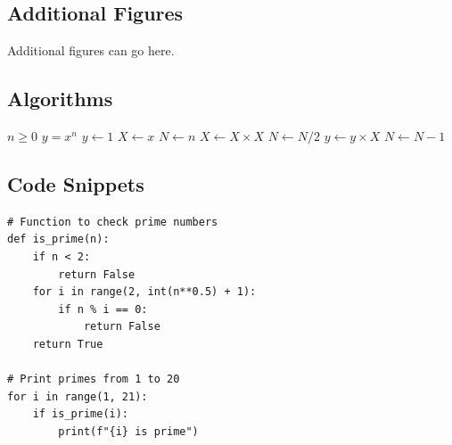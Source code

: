 \documentclass[11pt]{article}
\begin{document}
\subsection{Additional Figures}
Additional figures can go here.

\subsection{Algorithms}

\begin{algorithm}
\caption{An algorithm with caption}
\begin{algorithmic}
\Require $n \geq 0$
\Ensure $y = x^n$
\State $y \gets 1$
\State $X \gets x$
\State $N \gets n$
        \State $X \gets X \times X$
        \State $N \gets N/2$
    \Else
        \State $y \gets y \times X$
        \State $N \gets N - 1$
    \EndIf
\EndWhile
\end{algorithmic}
\end{algorithm}

\subsection{Code Snippets}

\begin{verbatim}
# Function to check prime numbers
def is_prime(n):
    if n < 2:
        return False
    for i in range(2, int(n**0.5) + 1):
        if n % i == 0:
            return False
    return True

# Print primes from 1 to 20
for i in range(1, 21):
    if is_prime(i):
        print(f"{i} is prime")
\end{verbatim}
\end{document}
